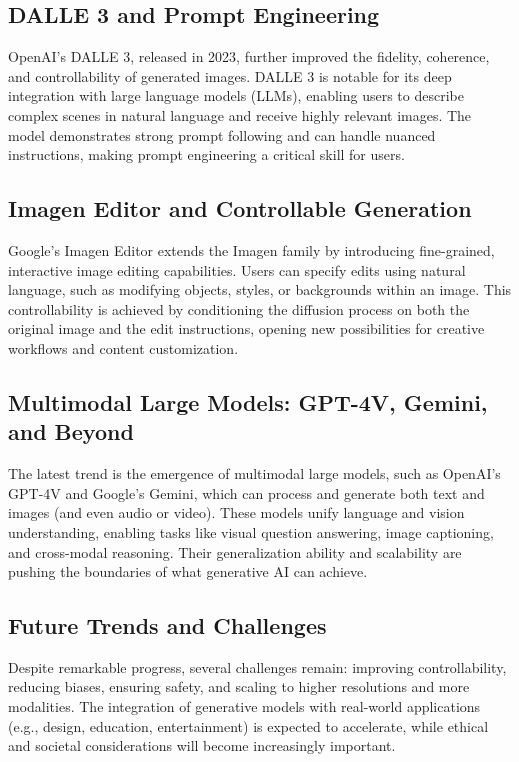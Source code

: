 \documentclass{article}
\begin{document}
\subsection{DALL\textperiodcentered E 3 and Prompt Engineering}
OpenAI's DALL\textperiodcentered E 3, released in 2023, further improved the fidelity, coherence, and controllability of generated images. DALL\textperiodcentered E 3 is notable for its deep integration with large language models (LLMs), enabling users to describe complex scenes in natural language and receive highly relevant images. The model demonstrates strong prompt following and can handle nuanced instructions, making prompt engineering a critical skill for users.

\subsection{Imagen Editor and Controllable Generation}
Google's Imagen Editor extends the Imagen family by introducing fine-grained, interactive image editing capabilities. Users can specify edits using natural language, such as modifying objects, styles, or backgrounds within an image. This controllability is achieved by conditioning the diffusion process on both the original image and the edit instructions, opening new possibilities for creative workflows and content customization.

\subsection{Multimodal Large Models: GPT-4V, Gemini, and Beyond}
The latest trend is the emergence of multimodal large models, such as OpenAI's GPT-4V and Google's Gemini, which can process and generate both text and images (and even audio or video). These models unify language and vision understanding, enabling tasks like visual question answering, image captioning, and cross-modal reasoning. Their generalization ability and scalability are pushing the boundaries of what generative AI can achieve.

\subsection{Future Trends and Challenges}
Despite remarkable progress, several challenges remain: improving controllability, reducing biases, ensuring safety, and scaling to higher resolutions and more modalities. The integration of generative models with real-world applications (e.g., design, education, entertainment) is expected to accelerate, while ethical and societal considerations will become increasingly important.
\end{document}

